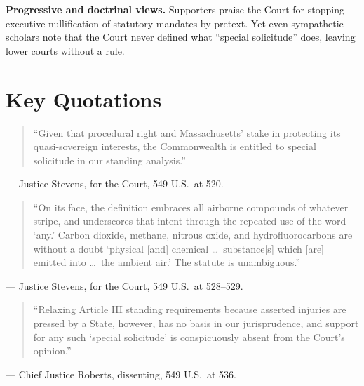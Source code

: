 \documentclass[12pt]{article}
\begin{document}
\textbf{Progressive and doctrinal views.} Supporters praise the Court for stopping executive nullification of statutory mandates by pretext. Yet even sympathetic scholars note that the Court never defined what ``special solicitude'' does, leaving lower courts without a rule.

\section{Key Quotations}

\begin{quote}
``Given that procedural right and Massachusetts' stake in protecting its quasi-sovereign interests, the Commonwealth is entitled to special solicitude in our standing analysis.''
\end{quote}
\noindent --- Justice Stevens, for the Court, 549 U.S.\ at 520.

\begin{quote}
``On its face, the definition embraces all airborne compounds of whatever stripe, and underscores that intent through the repeated use of the word `any.' Carbon dioxide, methane, nitrous oxide, and hydrofluorocarbons are without a doubt `physical [and] chemical \ldots\ substance[s] which [are] emitted into \ldots\ the ambient air.' The statute is unambiguous.''
\end{quote}
\noindent --- Justice Stevens, for the Court, 549 U.S.\ at 528--529.

\begin{quote}
``Relaxing Article III standing requirements because asserted injuries are pressed by a State, however, has no basis in our jurisprudence, and support for any such `special solicitude' is conspicuously absent from the Court's opinion.''
\end{quote}
\noindent --- Chief Justice Roberts, dissenting, 549 U.S.\ at 536.
\end{document}
